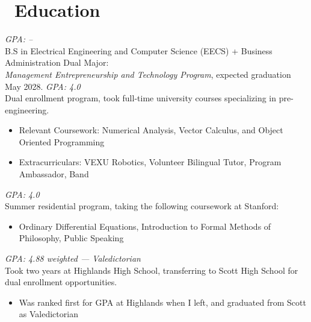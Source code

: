 \documentclass{resume}
\begin{document}
\section{\faGraduationCap\ Education}
\textit{GPA: --}\\
B.S in Electrical Engineering and Computer Science (EECS) + Business Administration Dual Major:\\
\textit{Management Entrepreneurship and Technology Program}, expected graduation May 2028.
\textit{GPA: 4.0}\\
Dual enrollment program, took full-time university courses specializing in pre-engineering.
\begin{itemize}
    \item Relevant Coursework: Numerical Analysis, Vector Calculus, and Object Oriented Programming
    \item Extracurriculars: VEXU Robotics, Volunteer Bilingual Tutor, Program Ambassador, Band
\end{itemize}
\datedsubsection{\textbf{Stanford}, CA}{Summer 2023}
\textit{GPA: 4.0}\\
Summer residential program, taking the following coursework at Stanford:
\begin{itemize}
    \item Ordinary Differential Equations, Introduction to Formal Methods of Philosophy, Public Speaking
\end{itemize}
\textit{GPA: 4.88 weighted --- Valedictorian}\\
Took two years at Highlands High School, transferring to Scott High School for dual enrollment opportunities.

\begin{itemize}
     \item Was ranked first for GPA at Highlands when I left, and graduated from Scott as Valedictorian
\end{itemize}
\end{document}
